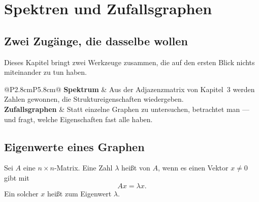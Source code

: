 \chapter{Spektren und Zufallsgraphen}

\section{Zwei Zugänge, die dasselbe wollen}

Dieses Kapitel bringt zwei Werkzeuge zusammen, die auf den ersten Blick nichts miteinander zu tun haben.

\begin{merksatz}
\begin{center}
\renewcommand{\arraystretch}{1.5}
\begin{tabular}{@{}P{2.8cm}P{5.8cm}@{}}
\toprule
\textbf{Spektrum} & Aus der Adjazenzmatrix von Kapitel~3 werden Zahlen gewonnen, die Struktureigenschaften wiedergeben.\\
\textbf{Zufallsgraphen} & Statt einzelne Graphen zu untersuchen, betrachtet man  --- und fragt, welche Eigenschaften fast alle haben.\\
\bottomrule
\end{tabular}
\end{center}

\begin{center}
\begin{minipage}{0.88\textwidth}
\end{minipage}
\end{center}
\end{merksatz}

\section{Eigenwerte eines Graphen}

\begin{definition}
Sei $A$ eine $n\times n$-Matrix. Eine Zahl $\lambda$ heißt  von $A$, wenn es einen Vektor $x \neq 0$ gibt mit
\[ A x = \lambda x . \]
Ein solcher $x$ heißt  zum Eigenwert $\lambda$.
\end{definition}

